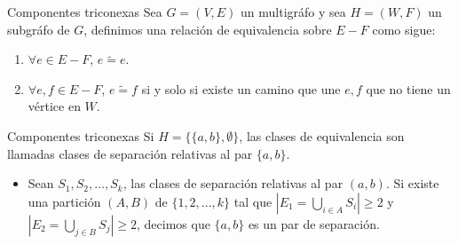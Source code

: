 \documentclass[spanish]{beamer}
\begin{document}
\begin{frame}{Componentes triconexas}
Sea $G = (V, E)$ un multigráfo y sea $H = (W, F)$ un subgráfo de $G$, definimos una relación de equivalencia sobre $E - F$ como sigue:
  \begin{definitions}
    \begin{enumerate}
    \item $\forall e \in E - F$, $e \widetilde{=} e$.
    \item $\forall e, f \in E - F$, $e \widetilde{=} f$ si y solo si existe un camino que une $e, f$ que no tiene un vértice en $W$.
    \end{enumerate}
  \end{definitions}
\end{frame}

\begin{frame}{Componentes triconexas}
Si $H = \{\{a, b\}, \emptyset\}$, las clases de equivalencia son llamadas clases de separación relativas al par $\{a, b\}$.
  \begin{definitions}
    \begin{itemize}
      \item Sean $S_1,S_2,\ldots, S_k$, las clases de separación relativas al par $(a,b)$. Si existe una partición $(A,B)$ de $\{1,2, . . . , k\}$ tal que $|E_{1} = \bigcup_{i \in A} S_i| \geq 2$ y $ |E_{2}= \bigcup_{j \in B} S_j| \geq 2$, decimos que $\{a,b\}$ es un par de separación.
    \end{itemize}
  \end{definitions}
\end{frame}
\end{document}
